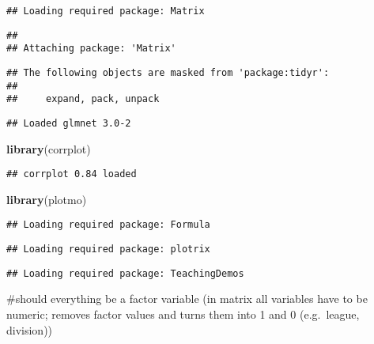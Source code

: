 \documentclass[]{article}
\newenvironment{Shaded}{\begin{snugshade}}{\end{snugshade}}
\newcommand{\KeywordTok}[1]{\textcolor[rgb]{0.13,0.29,0.53}{\textbf{#1}}}
\newcommand{\NormalTok}[1]{#1}
\begin{document}
\begin{verbatim}
## Loading required package: Matrix
\end{verbatim}

\begin{verbatim}
## 
## Attaching package: 'Matrix'
\end{verbatim}

\begin{verbatim}
## The following objects are masked from 'package:tidyr':
## 
##     expand, pack, unpack
\end{verbatim}

\begin{verbatim}
## Loaded glmnet 3.0-2
\end{verbatim}

\begin{Shaded}
\begin{Highlighting}[]
\KeywordTok{library}\NormalTok{(corrplot)}
\end{Highlighting}
\end{Shaded}

\begin{verbatim}
## corrplot 0.84 loaded
\end{verbatim}

\begin{Shaded}
\begin{Highlighting}[]
\KeywordTok{library}\NormalTok{(plotmo)}
\end{Highlighting}
\end{Shaded}

\begin{verbatim}
## Loading required package: Formula
\end{verbatim}

\begin{verbatim}
## Loading required package: plotrix
\end{verbatim}

\begin{verbatim}
## Loading required package: TeachingDemos
\end{verbatim}

\#should everything be a factor variable (in matrix all variables have
to be numeric; removes factor values and turns them into 1 and 0
(e.g.~league, division))
\end{document}
